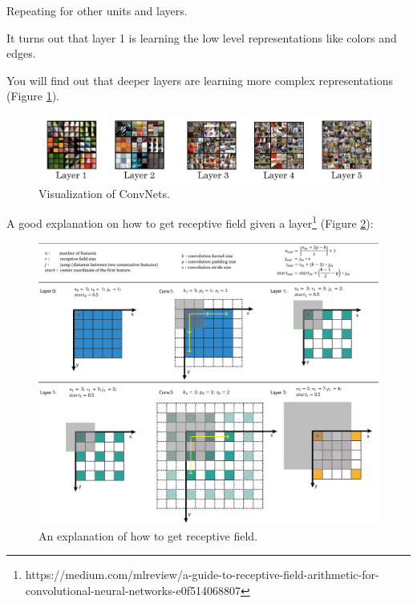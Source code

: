 Repeating for other units and layers.

It turns out that layer 1 is learning the low level representations like colors and edges.

You will find out that deeper layers are learning more complex representations\cite{zeiler2014visualizing} (Figure \ref{visualize-convs2}).

\begin{figure}[!htbp]
    \centering
    \includegraphics[width=1.0\textwidth]{img/c4/visualize-convnets2.png}
    \caption{Visualization of ConvNets.}
    \label{visualize-convs2}  
\end{figure}

A good explanation on how to get receptive field given a layer\footnote{https://medium.com/mlreview/a-guide-to-receptive-field-arithmetic-for-convolutional-neural-networks-e0f514068807} (Figure \ref{receptivefield}):

\begin{figure}[!htbp]
    \centering
    \includegraphics[width=1.0\textwidth]{img/c4/receptiveField.png}
    \caption{An explanation of how to get receptive field.}
    \label{receptivefield}  
\end{figure}  

